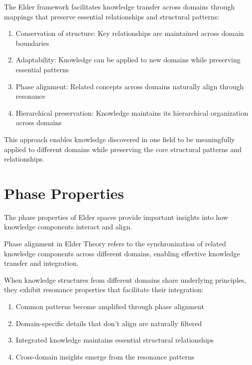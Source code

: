 \begin{theorem}
The Elder framework facilitates knowledge transfer across domains through mappings that preserve essential relationships and structural patterns:
\begin{enumerate}
    \item Conservation of structure: Key relationships are maintained across domain boundaries
    \item Adaptability: Knowledge can be applied to new domains while preserving essential patterns
    \item Phase alignment: Related concepts across domains naturally align through resonance
    \item Hierarchical preservation: Knowledge maintains its hierarchical organization across domains
\end{enumerate}
\end{theorem}

This approach enables knowledge discovered in one field to be meaningfully applied to different domains while preserving the core structural patterns and relationships.

\section{Phase Properties}

The phase properties of Elder spaces provide important insights into how knowledge components interact and align.

\begin{definition}
Phase alignment in Elder Theory refers to the synchronization of related knowledge components across different domains, enabling effective knowledge transfer and integration.
\end{definition}

\begin{theorem}
When knowledge structures from different domains share underlying principles, they exhibit resonance properties that facilitate their integration:
\begin{enumerate}
    \item Common patterns become amplified through phase alignment
    \item Domain-specific details that don't align are naturally filtered
    \item Integrated knowledge maintains essential structural relationships
    \item Cross-domain insights emerge from the resonance patterns
\end{enumerate}
\end{theorem}

